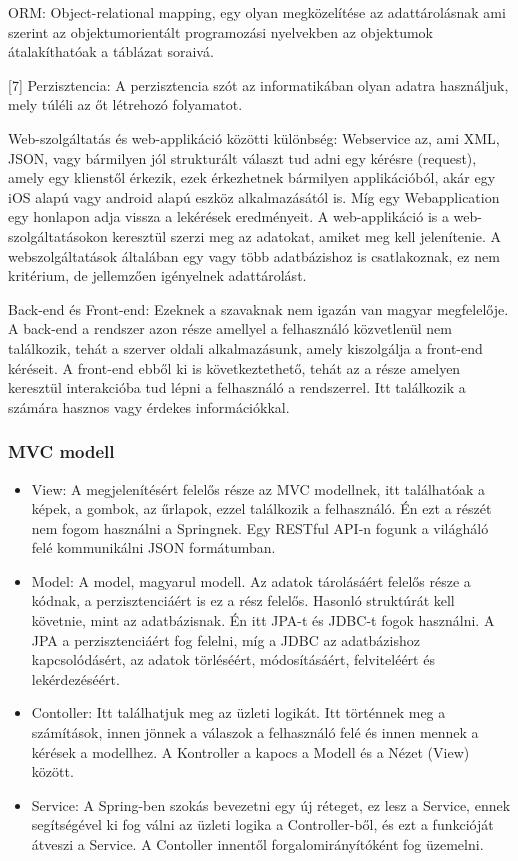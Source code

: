ORM: Object-relational mapping, egy olyan megközelítése az adattárolásnak ami szerint az objektumorientált programozási nyelvekben az objektumok átalakíthatóak a táblázat soraivá.

[7] Perzisztencia: A perzisztencia szót az informatikában olyan adatra használjuk, mely túléli az őt létrehozó folyamatot. 

Web-szolgáltatás és web-applikáció közötti különbség: Webservice az, ami XML, JSON, vagy bármilyen jól strukturált választ tud adni egy kérésre (request), amely egy klienstől érkezik, ezek érkezhetnek bármilyen applikációból, akár egy iOS alapú vagy android alapú eszköz alkalmazásától is. Míg egy Webapplication egy honlapon adja vissza a lekérések eredményeit. A web-applikáció is a web-szolgáltatásokon keresztül szerzi meg az adatokat, amiket meg kell jelenítenie. A webszolgáltatások általában egy vagy több adatbázishoz is csatlakoznak, ez nem kritérium, de jellemzően igényelnek adattárolást.

Back-end és Front-end: Ezeknek a szavaknak nem igazán van magyar megfelelője. A back-end a rendszer azon része amellyel a felhasználó közvetlenül nem találkozik, tehát a szerver oldali alkalmazásunk, amely kiszolgálja a front-end kéréseit. A front-end ebből ki is következtethető, tehát az a része amelyen keresztül interakcióba tud lépni a felhasználó a rendszerrel. Itt találkozik a számára hasznos vagy érdekes információkkal.

\subsubsection{MVC modell}
\begin{itemize}
\item View: A megjelenítésért felelős része az MVC modellnek, itt találhatóak a képek, a gombok, az űrlapok, ezzel találkozik a felhasználó. Én ezt a részét nem fogom használni a Springnek. Egy RESTful API-n fogunk a világháló felé kommunikálni JSON formátumban.

\item Model: A model, magyarul modell. Az adatok tárolásáért felelős része a kódnak, a perzisztenciáért is ez a rész felelős. Hasonló struktúrát kell követnie, mint az adatbázisnak. Én itt JPA-t és JDBC-t fogok használni. A JPA a perzisztenciáért fog felelni, míg a JDBC az adatbázishoz kapcsolódásért, az adatok törléséért, módosításáért, felviteléért és lekérdezéséért.

\item Contoller: Itt találhatjuk meg az üzleti logikát. Itt történnek meg a számítások, innen jönnek a válaszok a felhasználó felé és innen mennek a kérések a modellhez. A Kontroller a kapocs a Modell és a Nézet (View) között.

\item Service: A Spring-ben szokás bevezetni egy új réteget, ez lesz a Service, ennek segítségével ki fog válni az üzleti logika a Controller-ből, és ezt a funkcióját átveszi a Service. A Contoller innentől forgalomirányítóként fog üzemelni.
\end{itemize}

